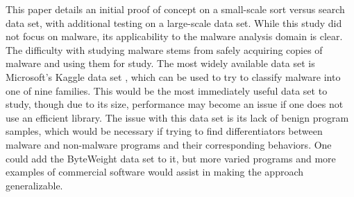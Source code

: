 This paper details an initial proof of concept on a small-scale sort versus search data set, with additional testing on a large-scale data set. While this study did not focus on malware, its applicability to the malware analysis domain is clear. The difficulty with studying malware stems from safely acquiring copies of malware and using them for study. The most widely available data set is Microsoft's Kaggle data set \cite{kaggle}, which can be used to try to classify malware into one of nine families. This would be the most immediately useful data set to study, though due to its size, performance may become an issue if one does not use an efficient library. The issue with this data set is its lack of benign program samples, which would be necessary if trying to find differentiators between malware and non-malware programs and their corresponding behaviors. One could add the ByteWeight data set to it, but more varied programs and more examples of commercial software would assist in making the approach generalizable.